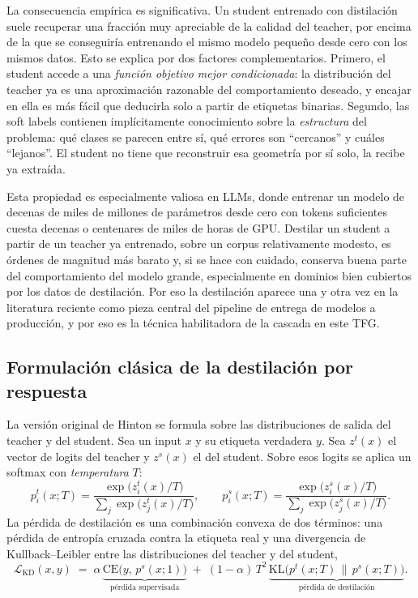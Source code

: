 La consecuencia empírica es significativa. Un student entrenado con distilación suele recuperar una fracción muy apreciable de la calidad del teacher, por encima de la que se conseguiría entrenando el mismo modelo pequeño desde cero con los mismos datos. Esto se explica por dos factores complementarios. Primero, el student accede a una \emph{función objetivo mejor condicionada}: la distribución del teacher ya es una aproximación razonable del comportamiento deseado, y encajar en ella es más fácil que deducirla solo a partir de etiquetas binarias. Segundo, las soft labels contienen implícitamente conocimiento sobre la \emph{estructura} del problema: qué clases se parecen entre sí, qué errores son ``cercanos'' y cuáles ``lejanos''. El student no tiene que reconstruir esa geometría por sí solo, la recibe ya extraída.

Esta propiedad es especialmente valiosa en LLMs, donde entrenar un modelo de decenas de miles de millones de parámetros desde cero con tokens suficientes cuesta decenas o centenares de miles de horas de GPU. Destilar un student a partir de un teacher ya entrenado, sobre un corpus relativamente modesto, es órdenes de magnitud más barato y, si se hace con cuidado, conserva buena parte del comportamiento del modelo grande, especialmente en dominios bien cubiertos por los datos de destilación. Por eso la destilación aparece una y otra vez en la literatura reciente como pieza central del pipeline de entrega de modelos a producción, y por eso es la técnica habilitadora de la cascada en este TFG.

\subsection{Formulación clásica de la destilación por respuesta}

La versión original de Hinton se formula sobre las distribuciones de salida del teacher y del student. Sea un input $x$ y su etiqueta verdadera $y$. Sea $z^t(x)$ el vector de logits del teacher y $z^s(x)$ el del student. Sobre esos logits se aplica un softmax con \emph{temperatura} $T$:
\[
p^t_i(x; T) = \frac{\exp\!\big(z^t_i(x)/T\big)}{\sum_j \exp\!\big(z^t_j(x)/T\big)}, \qquad
p^s_i(x; T) = \frac{\exp\!\big(z^s_i(x)/T\big)}{\sum_j \exp\!\big(z^s_j(x)/T\big)}.
\]
La pérdida de destilación es una combinación convexa de dos términos: una pérdida de entropía cruzada contra la etiqueta real y una divergencia de Kullback--Leibler entre las distribuciones del teacher y del student,
\[
\mathcal{L}_{\mathrm{KD}}(x, y) \;=\; \alpha \, \underbrace{\mathrm{CE}\!\big(y,\, p^s(x;1)\big)}_{\text{pérdida supervisada}} \;+\; (1-\alpha)\, T^2 \, \underbrace{\mathrm{KL}\!\big(p^t(x;T)\,\|\,p^s(x;T)\big)}_{\text{pérdida de destilación}}.
\]

